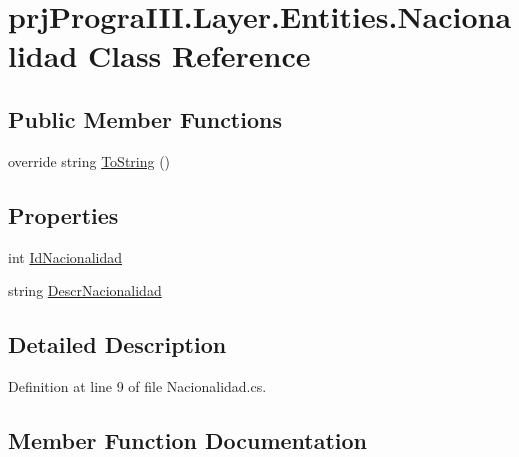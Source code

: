 \hypertarget{classprj_progra_i_i_i_1_1_layer_1_1_entities_1_1_nacionalidad}{}\section{prj\+Progra\+I\+I\+I.\+Layer.\+Entities.\+Nacionalidad Class Reference}
\label{classprj_progra_i_i_i_1_1_layer_1_1_entities_1_1_nacionalidad}
\subsection*{Public Member Functions}
\begin{DoxyCompactItemize}
\item 
override string \hyperlink{classprj_progra_i_i_i_1_1_layer_1_1_entities_1_1_nacionalidad_a89269e3532443d7b3427a7291068d996}{To\+String} ()
\end{DoxyCompactItemize}
\subsection*{Properties}
\begin{DoxyCompactItemize}
\item 
int \hyperlink{classprj_progra_i_i_i_1_1_layer_1_1_entities_1_1_nacionalidad_afc3f8d07b30d81d80ed29b7577264dc6}{Id\+Nacionalidad}
\item 
string \hyperlink{classprj_progra_i_i_i_1_1_layer_1_1_entities_1_1_nacionalidad_a5e94719cea624c494a476e57f2c098d3}{Descr\+Nacionalidad}
\end{DoxyCompactItemize}


\subsection{Detailed Description}


Definition at line 9 of file Nacionalidad.\+cs.



\subsection{Member Function Documentation}
\hypertarget{classprj_progra_i_i_i_1_1_layer_1_1_entities_1_1_nacionalidad_a89269e3532443d7b3427a7291068d996}{}\label{classprj_progra_i_i_i_1_1_layer_1_1_entities_1_1_nacionalidad_a89269e3532443d7b3427a7291068d996} 
